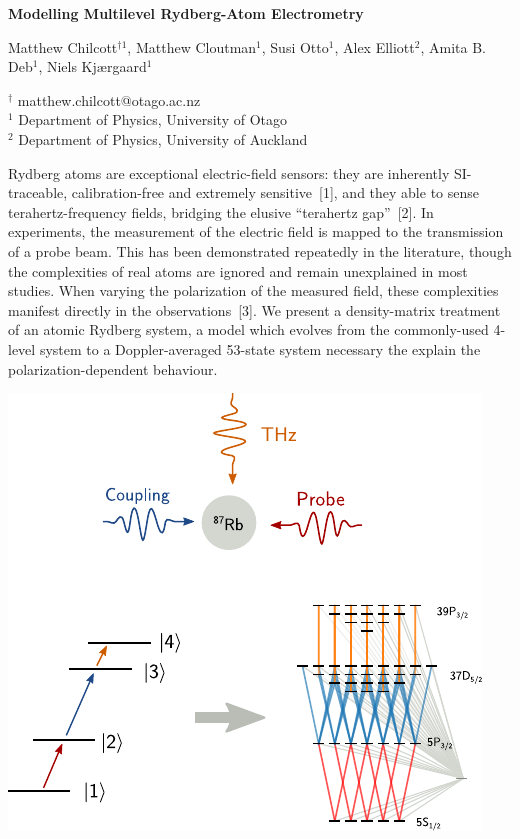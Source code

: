 \documentclass[a4paper]{article}
\begin{document}

\Large
\begin{center}
  \textbf{Modelling Multilevel Rydberg-Atom Electrometry}\\

  \hspace{10pt}

  \large
  Matthew Chilcott$^{\dagger 1}$, Matthew Cloutman$^1$, Susi Otto$^1$, Alex Elliott$^2$, Amita B. Deb$^1$,  Niels Kj{\ae}rgaard$^1$ \\

  \hspace{10pt}

  \small
  $^\dagger$ matthew.chilcott@otago.ac.nz\\
  $^1$ Department of Physics, University of Otago\\
  $^2$ Department of Physics, University of Auckland

\end{center}

\hspace{10pt}

\normalsize

Rydberg atoms are exceptional electric-field sensors: they are
inherently SI-traceable, calibration-free and extremely sensitive~[1],
and they able to sense terahertz-frequency fields, bridging the
elusive ``terahertz gap''~[2]. In experiments, the measurement of the
electric field is mapped to the transmission of a probe beam. This has
been demonstrated repeatedly in the literature, though the
complexities of real atoms are ignored and remain unexplained in most
studies. When varying the polarization of the measured field, these
complexities manifest directly in the observations~[3]. We present a
density-matrix treatment of an atomic Rydberg system, a model which
evolves from the commonly-used 4-level system to a Doppler-averaged
53-state system necessary the explain the polarization-dependent
behaviour.

\vspace{20pt}
\begin{center}
\includegraphics[width=0.7\linewidth]{Figure.pdf}
\end{center}
\end{document}
